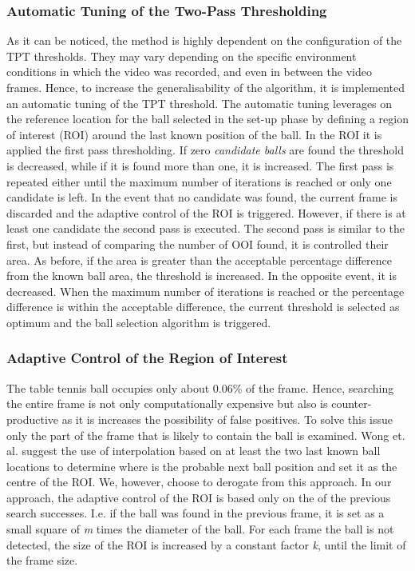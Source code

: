 \documentclass[a4paper]{article}
\begin{document}
\subsubsection{Automatic Tuning of the Two-Pass Thresholding}
As it can be noticed, the method is highly dependent on the configuration of the TPT thresholds. They may vary depending on the specific environment conditions in which the video was recorded, and even in between the video frames. Hence, to increase the generalisability of the algorithm, it is implemented an automatic tuning of the TPT threshold. 
The automatic tuning leverages on the reference location for the ball selected in the set-up phase by defining a region of interest (ROI) around the last known position of the ball. In the ROI it is applied the first pass thresholding. If zero \textit{candidate balls} are found the threshold is decreased, while if it is found more than one, it is increased. The first pass is repeated either until the maximum number of iterations is reached or only one candidate is left. In the event that no candidate was found, the current frame is discarded and the adaptive control of the ROI is triggered. However, if there is at least one candidate the second pass is executed. The second pass is similar to the first, but instead of comparing the number of OOI found, it is controlled their area. As before, if the area is greater than the acceptable percentage difference from the known ball area, the threshold is increased. In the opposite event, it is decreased. When the maximum number of iterations is reached or the percentage difference is within the acceptable difference, the current threshold is selected as optimum and the ball selection algorithm is triggered. 

\subsubsection{Adaptive Control of the Region of Interest}
The table tennis ball occupies only about 0.06\% of the frame. Hence, searching the entire frame is not only computationally expensive but also is counter-productive as it is increases the possibility of false positives. To solve this issue only the part of the frame that is likely to contain the ball is examined. Wong et. al.\cite{Wong} suggest the use of interpolation based on at least the two last known ball locations to determine where is the probable next ball position and set it as the centre of the ROI. We, however, choose to derogate from this approach. 
In our approach, the adaptive control of the ROI is based only on the of the previous search successes. I.e. if the ball was found in the previous frame, it is set as a small square of \textit{m} times the diameter of the ball. For each frame the ball is not detected, the size of the ROI is increased by a constant factor \textit{k}, until the limit of the frame size.
\end{document}
